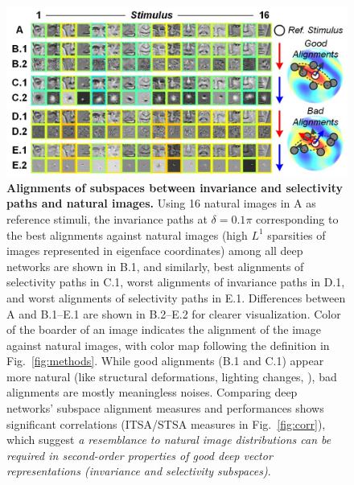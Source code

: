 \documentclass[10pt,twocolumn,letterpaper]{article}
\begin{document}
\begin{figure}
\begin{center}
\includegraphics[width=1.025\columnwidth, trim=1em 0 1em 0]{Figs/pic3.jpg} 
\end{center}
\caption{{\bf Alignments of subspaces between invariance and selectivity paths and natural images.}
Using 16 natural images in A as reference stimuli, the invariance paths at $\delta = 0.1\pi$ corresponding to the best alignments against natural images (\ie high $L^1$ sparsities of images represented in eigenface coordinates) among all deep networks are shown in B.1, and similarly, best alignments of selectivity paths in C.1, worst alignments of invariance paths in D.1, and worst alignments of selectivity paths in E.1.
Differences between A and B.1--E.1 are shown in B.2--E.2 for clearer visualization.
Color of the boarder of an image indicates the alignment of the image against natural images, with color map following the definition in Fig.~\ref{fig:methods}.
While good alignments (B.1 and C.1) appear more natural (like structural deformations, lighting changes, \etc), bad alignments are mostly meaningless noises.
Comparing deep networks' subspace alignment measures and performances shows significant correlations (ITSA/STSA measures in Fig.~\ref{fig:corr}), which suggest \emph{a resemblance to natural image distributions can be required in second-order properties of good deep vector representations (\ie invariance and selectivity subspaces)}.
} %
\label{fig:align}
\end{figure}
\end{document}
